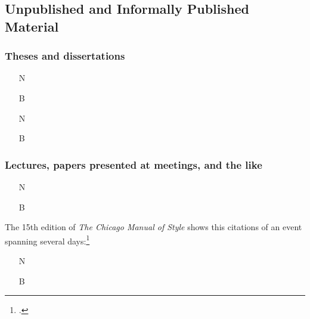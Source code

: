 \documentclass[11pt,letterpaper,oneside]{article}
\begin{document}

\setcounter{subsection}{2}
\subsection{Unpublished and Informally Published Material}
\setcounter{subsection}{14}

\setcounter{subsubsection}{223}
\subsubsection{Theses and dissertations}

\begin{itemize}
\item[N] 

\item[B] 

\item[N] 

\item[B] 
\end{itemize}

\setcounter{subsubsection}{225}
\subsubsection{Lectures, papers presented at meetings, and the like}

\begin{itemize}
\item[N] 

\item[B] 
\end{itemize}

\noindent The 15th edition of \textit{The Chicago Manual of Style}
shows this citations of an event spanning several
days:\footcite[17.215]{chicago2003}

\begin{itemize}
\item[N] 

\item[B] 
\end{itemize}
\end{document}
